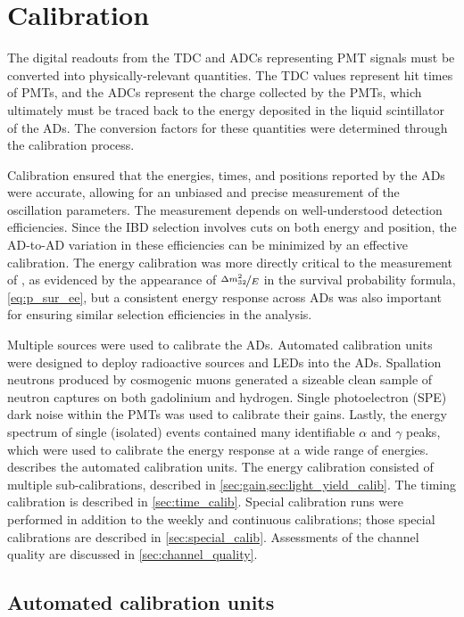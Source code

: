 \chapter{Calibration}
\label{ch:calibration}


The digital readouts from the TDC and ADCs representing PMT signals
must be converted into physically-relevant quantities.
The TDC values represent hit times of PMTs,
and the ADCs represent the charge collected by the PMTs,
which ultimately must be traced back to the energy deposited
in the liquid scintillator of the ADs.
The conversion factors for these quantities were determined
through the calibration process.

Calibration ensured that the energies, times, and positions
reported by the ADs were accurate,
allowing for an unbiased and precise measurement
of the oscillation parameters.
The \thetaot{} measurement depends on well-understood detection efficiencies.
Since the IBD selection involves cuts on both energy and position,
the AD-to-AD variation in these efficiencies can be minimized
by an effective calibration.
The energy calibration was more directly critical to the measurement
of \dmsquared{}, as evidenced by the appearance of $\nicefrac{\Delta m^2_{32}}{E}$
in the survival probability formula, \cref{eq:p_sur_ee},
but a consistent energy response across ADs
was also important for ensuring similar selection efficiencies
in the \thetaot{} analysis.

Multiple sources were used to calibrate the ADs.
Automated calibration units were designed to deploy radioactive sources
and LEDs into the ADs.
Spallation neutrons produced by cosmogenic muons
generated a sizeable clean sample of neutron captures
on both gadolinium and hydrogen.
Single photoelectron (SPE) dark noise within the PMTs
was used to calibrate their gains.
Lastly, the energy spectrum of single (isolated) events
contained many identifiable $\alpha$ and $\gamma$ peaks,
which were used to calibrate the energy response at a wide range of energies.
 describes the automated calibration units.
The energy calibration consisted of multiple sub-calibrations,
described in \cref{sec:gain,sec:light_yield_calib}.
The timing calibration is described in \cref{sec:time_calib}.
Special calibration runs were performed in addition to
the weekly and continuous calibrations;
those special calibrations are described in \cref{sec:special_calib}.
Assessments of the channel quality are discussed in \cref{sec:channel_quality}.

\section{Automated calibration units}
\label{sec:acus}

